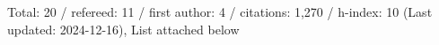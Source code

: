 Total: 20 / refereed: 11 / first author: 4 / citations: 1,270 / h-index: 10 (Last updated: 2024-12-16), List attached below